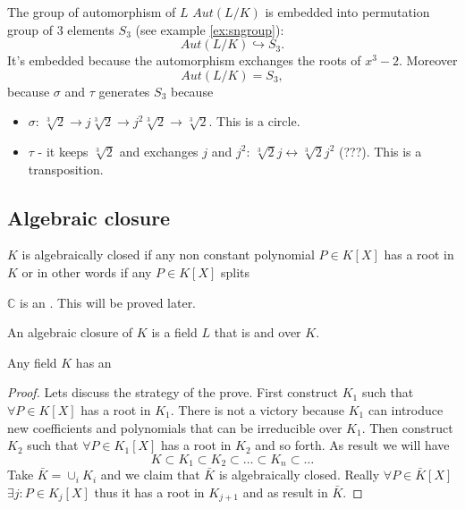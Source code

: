 \begin{example}
  The group of automorphism of $L$ $Aut\left(L/K\right)$ is embedded
  into permutation group of 3 elements $S_3$ (see example \ref{ex:sngroup}):
  \[
  Aut\left(L/K\right) \hookrightarrow S_3.
  \]
  It's embedded because the automorphism exchanges the roots of
  $x^3-2$. Moreover
  \[
  Aut\left(L/K\right) = S_3,
  \]
  because $\sigma$ and $\tau$ generates $S_3$ because
  \begin{itemize}
  \item $\sigma$: $\sqrt[3]{2} \to j \sqrt[3]{2} \to j^2 \sqrt[3]{2}
    \to \sqrt[3]{2}$. This is a circle.
  \item $\tau$ - it keeps $\sqrt[3]{2}$ and exchanges $j$ and $j^2$:
    $\sqrt[3]{2} j \leftrightarrow \sqrt[3]{2} j^2$ (???). This is a
    transposition. 
  \end{itemize}
\end{example}

\subsection{Algebraic closure}

\begin{definition}
  $K$ is algebraically closed if any non constant polynomial $P \in
  K\left[X\right]$ has a root in $K$ or in other words if any $P \in
  K\left[X\right]$ splits
  \label{def:algebraicallyclosed}
\end{definition}

\begin{example}[$\mathbb{C}$]
  $\mathbb{C}$ is an . This will be
  proved later.
\end{example}

\begin{definition}
  An algebraic closure of $K$ is a field $L$ that is
   and
  over $K$.
  \label{def:algebraicclosure}
\end{definition}

\begin{theorem}
  Any field $K$ has an 
  \begin{proof}
    Lets discuss the strategy of the prove.
    First construct $K_1$ such that $\forall P \in K\left[X\right]$
    has a root in $K_1$. There is not a victory because $K_1$ can
    introduce new coefficients and polynomials that can be irreducible
    over $K_1$. Then construct $K_2$ such that $\forall P \in
    K_1\left[X\right]$ has a root in $K_2$ and so forth. As result we
    will have
    \[
    K \subset K_1 \subset K_2 \subset \dots \subset K_n \subset \dots
    \]
    Take $\bar{K} = \cup_i K_i$ and we claim that $\bar{K}$ is
    algebraically closed. Really
    $\forall P \in \bar{K}\left[X\right]$ $\exists j: P \in
    K_j\left[X\right]$ thus it has a root in $K_{j+1}$ and as result
    in $\bar{K}$.
  \end{proof}
  \label{thm:lec2_2}
\end{theorem}

